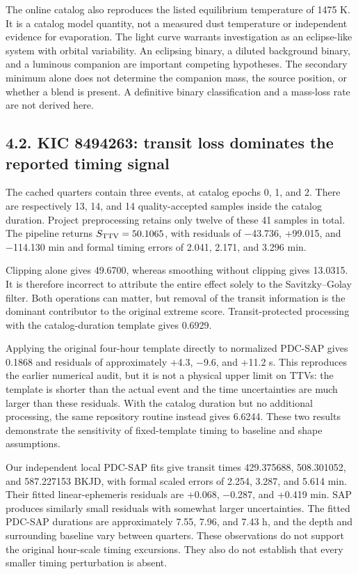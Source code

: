 \documentclass[
  english,
]{article}
\begin{document}
The online catalog also reproduces the listed equilibrium temperature of
1475 K. It is a catalog model quantity, not a measured dust temperature
or independent evidence for evaporation. The light curve warrants
investigation as an eclipse-like system with orbital variability. An
eclipsing binary, a diluted background binary, and a luminous companion
are important competing hypotheses. The secondary minimum alone does not
determine the companion mass, the source position, or whether a blend is
present. A definitive binary classification and a mass-loss rate are not
derived here.

\subsection{4.2. KIC 8494263: transit loss dominates the reported timing
signal}\label{kic-8494263-transit-loss-dominates-the-reported-timing-signal}

The cached quarters contain three events, at catalog epochs 0, 1, and 2.
There are respectively 13, 14, and 14 quality-accepted samples inside
the catalog duration. Project preprocessing retains only twelve of these
41 samples in total. The pipeline returns \(S_{\rm TTV}=50.1065\), with
residuals of −43.736, +99.015, and −114.130 min and formal timing errors
of 2.041, 2.171, and 3.296 min.

Clipping alone gives 49.6700, whereas smoothing without clipping gives
13.0315. It is therefore incorrect to attribute the entire effect solely
to the Savitzky--Golay filter. Both operations can matter, but removal
of the transit information is the dominant contributor to the original
extreme score. Transit-protected processing with the catalog-duration
template gives 0.6929.

Applying the original four-hour template directly to normalized PDC-SAP
gives 0.1868 and residuals of approximately +4.3, −9.6, and +11.2 s.
This reproduces the earlier numerical audit, but it is not a physical
upper limit on TTVs: the template is shorter than the actual event and
the time uncertainties are much larger than these residuals. With the
catalog duration but no additional processing, the same repository
routine instead gives 6.6244. These two results demonstrate the
sensitivity of fixed-template timing to baseline and shape assumptions.

Our independent local PDC-SAP fits give transit times 429.375688,
508.301052, and 587.227153 BKJD, with formal scaled errors of 2.254,
3.287, and 5.614 min. Their fitted linear-ephemeris residuals are
+0.068, −0.287, and +0.419 min. SAP produces similarly small residuals
with somewhat larger uncertainties. The fitted PDC-SAP durations are
approximately 7.55, 7.96, and 7.43 h, and the depth and surrounding
baseline vary between quarters. These observations do not support the
original hour-scale timing excursions. They also do not establish that
every smaller timing perturbation is absent.
\end{document}
